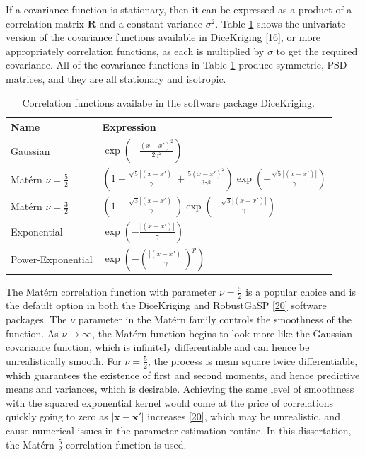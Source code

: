 \documentclass[
  12pt,
  a4paper,
  twoside]{book}
\begin{document}
If a covariance function is stationary, then it can be expressed as a product of a correlation matrix \(\mathbf{R}\) and a constant variance \(\sigma^2\). Table \ref{tab:kernels} shows the univariate version of the covariance functions available in DiceKriging \protect\hyperlink{ref-dicekriging}{{[}16{]}}, or more appropriately correlation functions, as each is multiplied by \(\sigma\) to get the required covariance. All of the covariance functions in Table \ref{tab:kernels} produce symmetric, PSD matrices, and they are all stationary and isotropic.

\begin{table}\centering
\caption{Correlation functions availabe in the software package DiceKriging.}
\label{tab:kernels}
\begin{tabular}{|l|l|}
\hline
\textbf{Name} & \textbf{Expression} \\
\hline
Gaussian & $\exp(- \frac{(x - x')^2}{2\gamma^2})$\\
Matérn  $\nu = \frac{5}{2}$ & $\left( 1 + \frac{\sqrt{5}|(x - x')|}{\gamma} + \frac{5(x - x')^2}{3\gamma^2}\right)\exp\left(-\frac{\sqrt{5}|(x - x')|}{\gamma} \right)$ \\
Matérn $\nu = \frac{3}{2}$ &$\left( 1 + \frac{\sqrt{3}|(x - x')|}{\gamma}\right)\exp(-\frac{\sqrt{3}|(x - x')|}{\gamma})$\\
Exponential & $\exp\left(-\frac{|(x - x')|}{\gamma} \right)$\\
Power-Exponential & $\exp\left(-\left(\frac{|(x - x')|}{\gamma}\right)^p\right)$\\
\hline
\end{tabular}
\end{table}

The Matérn correlation function with parameter \(\nu = \frac{5}{2}\) is a popular choice and is the default option in both the DiceKriging and RobustGaSP \protect\hyperlink{ref-rgasp_manual}{{[}20{]}} software packages. The \(\nu\) parameter in the Matérn family controls the smoothness of the function. As \(\nu \rightarrow \infty\), the Matérn function begins to look more like the Gaussian covariance function, which is infinitely differentiable and can hence be unrealistically smooth. For \(\nu = \frac{5}{2}\), the process is mean square twice differentiable, which guarantees the existence of first and second moments, and hence predictive means and variances, which is desirable. Achieving the same level of smoothness with the squared exponential kernel would come at the price of correlations quickly going to zero as \(|\mathbf{x} - \mathbf{x'}|\) increases \protect\hyperlink{ref-rgasp_manual}{{[}20{]}}, which may be unrealistic, and cause numerical issues in the parameter estimation routine. In this dissertation, the Matérn \(\frac{5}{2}\) correlation function is used.
\end{document}
